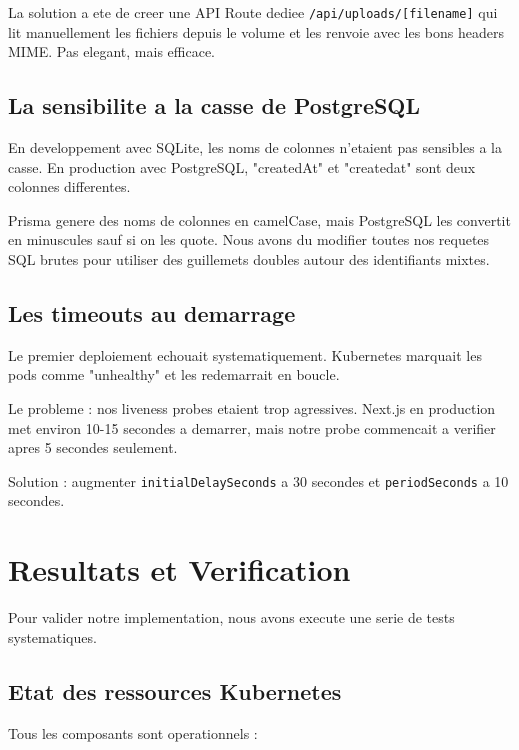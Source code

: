 \documentclass[12pt,a4paper]{article}
\begin{document}
La solution a ete de creer une API Route dediee \texttt{/api/uploads/[filename]} qui lit manuellement les fichiers depuis le volume et les renvoie avec les bons headers MIME. Pas elegant, mais efficace.

\subsection{La sensibilite a la casse de PostgreSQL}

En developpement avec SQLite, les noms de colonnes n'etaient pas sensibles a la casse. En production avec PostgreSQL, "createdAt" et "createdat" sont deux colonnes differentes.

Prisma genere des noms de colonnes en camelCase, mais PostgreSQL les convertit en minuscules sauf si on les quote. Nous avons du modifier toutes nos requetes SQL brutes pour utiliser des guillemets doubles autour des identifiants mixtes.

\subsection{Les timeouts au demarrage}

Le premier deploiement echouait systematiquement. Kubernetes marquait les pods comme "unhealthy" et les redemarrait en boucle.

Le probleme : nos liveness probes etaient trop agressives. Next.js en production met environ 10-15 secondes a demarrer, mais notre probe commencait a verifier apres 5 secondes seulement.

Solution : augmenter \texttt{initialDelaySeconds} a 30 secondes et \texttt{periodSeconds} a 10 secondes.

\section{Resultats et Verification}

Pour valider notre implementation, nous avons execute une serie de tests systematiques.

\subsection{Etat des ressources Kubernetes}

Tous les composants sont operationnels :
\end{document}
